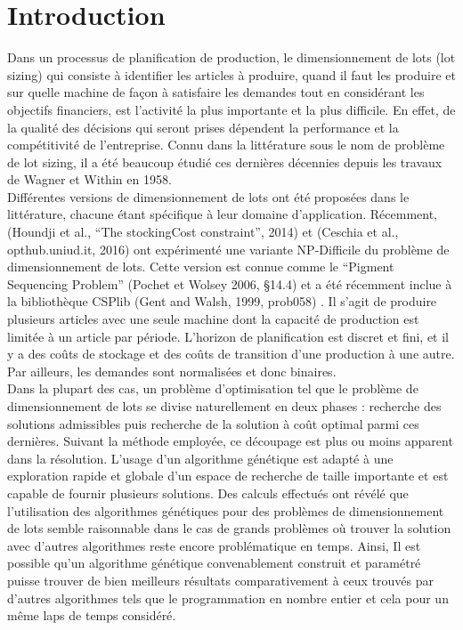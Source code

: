 \documentclass[12pt,a4paper]{article}
\begin{document}
	  
	
	\newpage
	
	\part*{Introduction}
	
	Dans un processus de planification de production, le dimensionnement
de lots (lot sizing) qui consiste à identifier les articles à produire, quand il
faut les produire et sur quelle machine de façon à satisfaire les demandes
tout en considérant les objectifs financiers, est l’activité la plus importante
et la plus difficile. En effet, de la qualité des décisions qui seront prises
dépendent la performance et la compétitivité de l’entreprise. Connu dans la
littérature sous le nom de problème de lot sizing, il a été beaucoup étudié
ces dernières décennies depuis les travaux de Wagner et Within en 1958. \\
	\hspace*{.5cm} Différentes versions de dimensionnement de lots ont été proposées dans le littérature, chacune étant spécifique à leur domaine d'application. Récemment, (Houndji et al., “The stockingCost constraint”, 2014) et (Ceschia et al., opthub.uniud.it, 2016) ont expérimenté une variante NP-Difficile du problème de dimensionnement de lots. Cette version est connue comme le “Pigment Sequencing Problem” (Pochet et Wolsey 2006, §14.4) et a été récemment inclue à la bibliothèque CSPlib (Gent and Walsh, 1999, prob058) . Il s'agit de produire plusieurs articles avec une seule machine dont la capacité de production est limitée à un article par période. L'horizon de planification est discret et fini, et il y a des coûts de stockage et des coûts de transition d'une production à une autre. Par ailleurs, les demandes sont normalisées et donc binaires. \\
	\hspace*{.5cm} Dans la plupart des cas, un problème d’optimisation tel que le problème de dimensionnement de lots se divise naturellement en deux phases : recherche des solutions admissibles puis recherche de la solution à coût optimal parmi ces dernières. Suivant la méthode employée, ce découpage est plus ou moins apparent dans la résolution. L’usage d’un algorithme génétique est adapté à une exploration rapide et globale d’un espace de recherche de taille importante et est capable de fournir plusieurs solutions. Des calculs effectués ont révélé que l'utilisation des algorithmes génétiques pour des problèmes de dimensionnement de lots semble raisonnable dans le cas de grands problèmes où trouver la solution avec d'autres algorithmes reste encore problématique en temps. Ainsi, Il est possible qu'un algorithme génétique convenablement construit et paramétré puisse trouver de bien meilleurs résultats comparativement à ceux trouvés par d'autres algorithmes tels que le programmation en nombre entier et cela pour un même laps de temps considéré.
	
\end{document}

